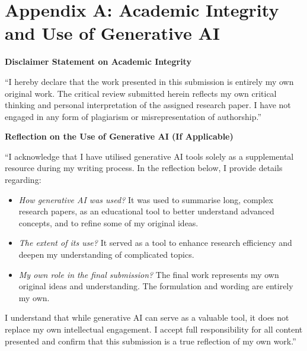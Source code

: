 \documentclass[11pt]{article}
\begin{document}
\thispagestyle{fancy}

\section*{Appendix A: Academic Integrity and Use of Generative AI}

\begin{tcolorbox}[mybox]
\textbf{Disclaimer Statement on Academic Integrity}

“I hereby declare that the work presented in this submission is entirely my own original work. The critical review submitted herein reflects my own critical thinking and personal interpretation of the assigned research paper. I have not engaged in any form of plagiarism or misrepresentation of authorship.”
\end{tcolorbox}

\vspace{1em}

%

\vspace{1em}

\begin{tcolorbox}[mybox]
\textbf{Reflection on the Use of Generative AI (If Applicable)}

“I acknowledge that I have utilised generative AI tools solely as a supplemental resource during my writing process. In the reflection below, I provide details regarding:
\begin{itemize}
    \item \textit{How generative AI was used?} It was used to summarise long, complex research papers, as an educational tool to better understand advanced concepts, and to refine some of my original ideas.
    \item \textit{The extent of its use?} It served as a tool to enhance research efficiency and deepen my understanding of complicated topics.
    \item \textit{My own role in the final submission?} The final work represents my own original ideas and understanding. The formulation and wording are entirely my own.
\end{itemize}
I understand that while generative AI can serve as a valuable tool, it does not replace my own intellectual engagement. I accept full responsibility for all content presented and confirm that this submission is a true reflection of my own work.”
\end{tcolorbox}
\end{document}
